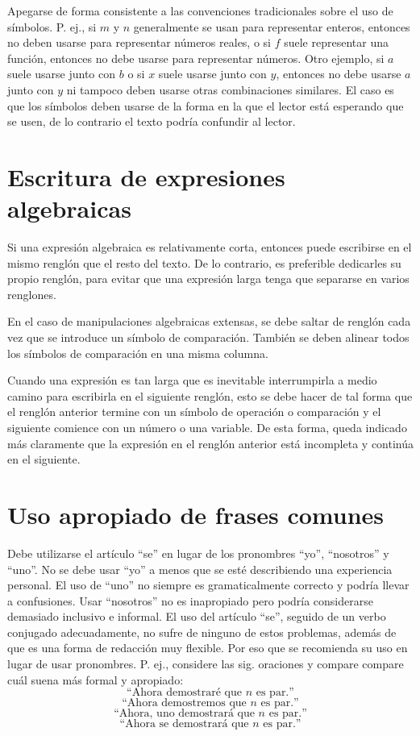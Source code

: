 Apegarse de forma consistente a las convenciones tradicionales sobre el uso de símbolos.
P. ej., si \(m\) y \(n\) generalmente se usan para representar enteros, entonces no deben usarse para representar números reales, o si \(f\) suele representar una función, entonces no debe usarse para representar números.
Otro ejemplo, si \(a\) suele usarse junto con \(b\) o si \(x\) suele usarse junto con \(y\), entonces no debe usarse \(a\) junto con \(y\) ni tampoco deben usarse otras combinaciones similares.
El caso es que los símbolos deben usarse de la forma en la que el lector está esperando que se usen, de lo contrario el texto podría confundir al lector.


\section{Escritura de expresiones algebraicas}

Si una expresión algebraica es relativamente corta, entonces puede escribirse en el mismo renglón que el resto del texto.
De lo contrario, es preferible dedicarles su propio renglón, para evitar que una expresión larga tenga que separarse en varios renglones. 

En el caso de manipulaciones algebraicas extensas, se debe saltar de renglón cada vez que se introduce un símbolo de comparación. 
También se deben alinear todos los símbolos de comparación en una misma columna. 

Cuando una expresión es tan larga que es inevitable interrumpirla a medio camino para escribirla en el siguiente renglón, esto se debe hacer de tal forma que el renglón anterior termine con un símbolo de operación o comparación y el siguiente comience con un número o una variable.
De esta forma, queda indicado más claramente que la expresión en el renglón anterior está incompleta y continúa en el siguiente. 


\section{Uso apropiado de frases comunes}

Debe utilizarse el artículo ``se'' en lugar de los pronombres ``yo'', ``nosotros'' y ``uno''.
No se debe usar ``yo'' a menos que se esté describiendo una experiencia personal.
El uso de ``uno'' no siempre es gramaticalmente correcto y podría llevar a confusiones.
Usar ``nosotros'' no es inapropiado pero podría considerarse demasiado inclusivo e informal.
El uso del artículo ``se'', seguido de un verbo conjugado adecuadamente, no sufre de ninguno de estos problemas, además de que es una forma de redacción muy flexible.
Por eso que se recomienda su uso en lugar de usar pronombres.
P. ej., considere las sig. oraciones y compare compare cuál suena más formal y apropiado:
\[
  \text{``Ahora demostraré que }n\text{ es par.''}
\]
\[
  \text{``Ahora demostremos que }n\text{ es par.''}
\]
\[
  \text{``Ahora, uno demostrará que }n\text{ es par.''}
\]
\[
  \text{``Ahora se demostrará que }n\text{ es par.''}
\]

